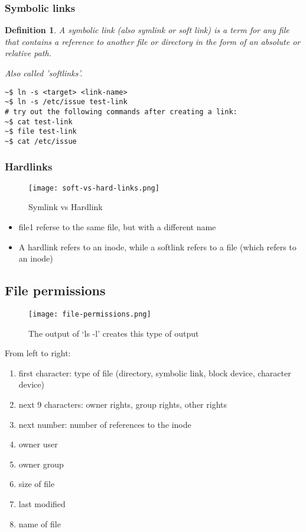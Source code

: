 \documentclass{article}
\newtheorem{theorem}{Definition}[section]
\begin{document}
\subsubsection{Symbolic links}

\begin{theorem}
    A symbolic link (also symlink or soft link) is a term for any 
    file that contains a reference to another file or directory 
    in the form of an absolute or relative path.

    Also called 'softlinks'.
\end{theorem}

\begin{verbatim}
~$ ln -s <target> <link-name>
~$ ln -s /etc/issue test-link
# try out the following commands after creating a link:
~$ cat test-link
~$ file test-link
~$ cat /etc/issue
\end{verbatim}


\subsubsection{Hardlinks}

\begin{figure}[H]
    \centering
    \texttt{[image: soft-vs-hard-links.png]}
    \caption{Symlink vs Hardlink}
\end{figure}

\begin{itemize}
    \item file1 referse to the same file, but with a different name
    \item A hardlink refers to an inode, while a softlink refers to a file (which refers to an inode)
\end{itemize}

\subsection{File permissions}

\begin{figure}[H]
    \centering
    \texttt{[image: file-permissions.png]}
    \caption{The output of `ls -l' creates this type of output}
\end{figure}

From left to right:

\begin{enumerate}
    \item first character: type of file (directory, symbolic link, block device, character device)
    \item next 9 characters: owner rights, group rights, other rights
    \item next number: number of references to the inode
    \item owner user
    \item owner group
    \item size of file
    \item last modified
    \item name of file
\end{enumerate}
\end{document}
